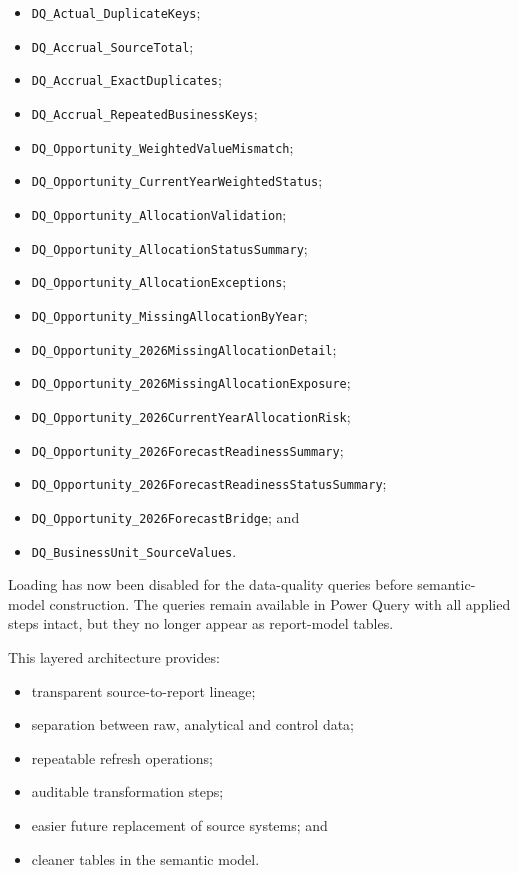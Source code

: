 \documentclass[11pt,a4paper]{article}
\begin{document}
\begin{itemize}[leftmargin=7mm,itemsep=2pt]
    \item \texttt{DQ\_Actual\_DuplicateKeys};
    \item \texttt{DQ\_Accrual\_SourceTotal};
    \item \texttt{DQ\_Accrual\_ExactDuplicates};
    \item \texttt{DQ\_Accrual\_RepeatedBusinessKeys};
    \item \texttt{DQ\_Opportunity\_WeightedValueMismatch};
    \item \texttt{DQ\_Opportunity\_CurrentYearWeightedStatus};
    \item \texttt{DQ\_Opportunity\_AllocationValidation};
    \item \texttt{DQ\_Opportunity\_AllocationStatusSummary};
    \item \texttt{DQ\_Opportunity\_AllocationExceptions};
    \item \texttt{DQ\_Opportunity\_MissingAllocationByYear};
    \item \texttt{DQ\_Opportunity\_2026MissingAllocationDetail};
    \item \texttt{DQ\_Opportunity\_2026MissingAllocationExposure};
    \item \texttt{DQ\_Opportunity\_2026CurrentYearAllocationRisk};
    \item \texttt{DQ\_Opportunity\_2026ForecastReadinessSummary};
    \item \texttt{DQ\_Opportunity\_2026ForecastReadinessStatusSummary};
    \item \texttt{DQ\_Opportunity\_2026ForecastBridge}; and
    \item \texttt{DQ\_BusinessUnit\_SourceValues}.
\end{itemize}

Loading has now been disabled for the data-quality queries before semantic-model
construction. The queries remain available in Power Query with all applied
steps intact, but they no longer appear as report-model tables.

This layered architecture provides:

\begin{itemize}[leftmargin=7mm,itemsep=2pt]
    \item transparent source-to-report lineage;
    \item separation between raw, analytical and control data;
    \item repeatable refresh operations;
    \item auditable transformation steps;
    \item easier future replacement of source systems; and
    \item cleaner tables in the semantic model.
\end{itemize}
\end{document}
